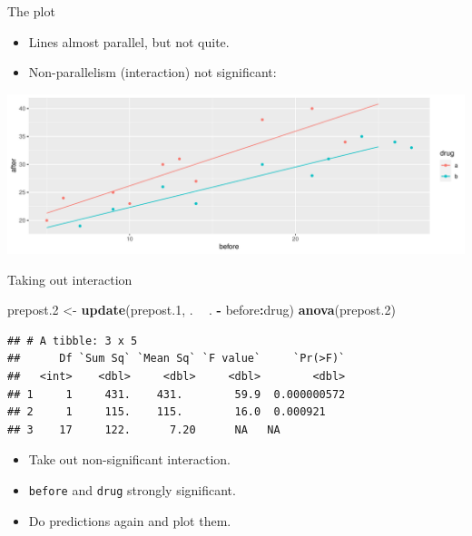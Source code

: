 \documentclass[
  ignorenonframetext,
]{beamer}
\newenvironment{Shaded}{\begin{snugshade}}{\end{snugshade}}
\newcommand{\FloatTok}[1]{\textcolor[rgb]{0.00,0.00,0.81}{#1}}
\newcommand{\KeywordTok}[1]{\textcolor[rgb]{0.13,0.29,0.53}{\textbf{#1}}}
\newcommand{\NormalTok}[1]{#1}
\newcommand{\OperatorTok}[1]{\textcolor[rgb]{0.81,0.36,0.00}{\textbf{#1}}}
\newcommand{\StringTok}[1]{\textcolor[rgb]{0.31,0.60,0.02}{#1}}
\begin{document}
\begin{frame}{The plot}
\protect\hypertarget{the-plot-5}{}

\begin{itemize}
\item
  Lines almost parallel, but not quite.
\item
  Non-parallelism (interaction) not significant:
\end{itemize}

\includegraphics{slides_d29_files/figure-beamer/nachwazzo-1.pdf}

\end{frame}

\begin{frame}[fragile]{Taking out interaction}
\protect\hypertarget{taking-out-interaction}{}

\small

\begin{Shaded}
\begin{Highlighting}[]
\NormalTok{prepost}\FloatTok{.2}\NormalTok{ <-}\StringTok{ }\KeywordTok{update}\NormalTok{(prepost}\FloatTok{.1}\NormalTok{, . }\OperatorTok{~}\StringTok{ }\NormalTok{. }\OperatorTok{-}\StringTok{ }\NormalTok{before}\OperatorTok{:}\NormalTok{drug)}
\KeywordTok{anova}\NormalTok{(prepost}\FloatTok{.2}\NormalTok{)}
\end{Highlighting}
\end{Shaded}

\begin{verbatim}
## # A tibble: 3 x 5
##      Df `Sum Sq` `Mean Sq` `F value`     `Pr(>F)`
##   <int>    <dbl>     <dbl>     <dbl>        <dbl>
## 1     1     431.    431.        59.9  0.000000572
## 2     1     115.    115.        16.0  0.000921   
## 3    17     122.      7.20      NA   NA
\end{verbatim}

\normalsize

\begin{itemize}
\item
  Take out non-significant interaction.
\item
  \texttt{before} and \texttt{drug} strongly significant.
\item
  Do predictions again and plot them.
\end{itemize}

\end{frame}
\end{document}
